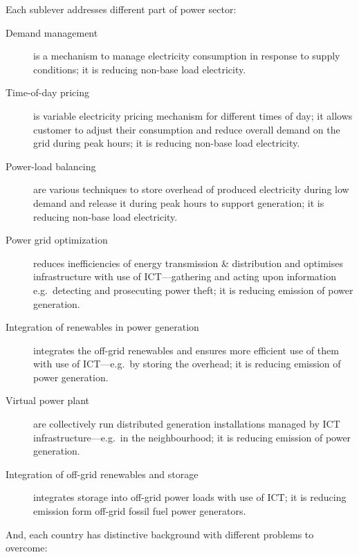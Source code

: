 \documentclass[11pt, twocolumn]{article}
\begin{document}
Each sublever addresses different part of power sector:
\begin{description}
\item[Demand management] is a mechanism to manage electricity consumption in response to supply conditions; it is reducing non-base load electricity.

\item[Time-of-day pricing] is variable electricity pricing mechanism for different times of day; it allows customer to adjust their consumption and reduce overall demand on the grid during peak hours; it is reducing non-base load electricity.

\item[Power-load balancing] are various techniques to store overhead of produced electricity during low demand and release it during peak hours to support generation; it is reducing non-base load electricity.

\item[Power grid optimization] reduces inefficiencies of energy transmission \& distribution and optimises infrastructure with use of ICT---gathering and acting upon information e.g.\ detecting and prosecuting power theft; it is reducing emission of power generation.

\item[Integration of renewables in power generation] integrates the off-grid renewables and ensures more efficient use of them with use of ICT---e.g.\ by storing the overhead; it is reducing emission of power generation.

\item[Virtual power plant] are collectively run distributed generation installations managed by ICT infrastructure---e.g.\ in the neighbourhood; it is reducing emission of power generation.

\item[Integration of off-grid renewables and storage] integrates storage into off-grid power loads with use of ICT; it is reducing emission form off-grid fossil fuel power generators.
\end{description}

And, each country has distinctive background with different problems to overcome:
\end{document}
